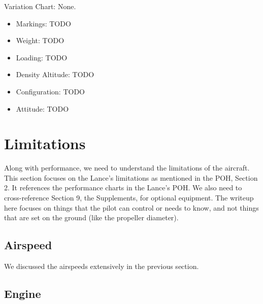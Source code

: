 Variation Chart: None.

\begin{itemize}
\item Markings: TODO
\item Weight: TODO
\item Loading: TODO
\item Density Altitude: TODO
\item Configuration: TODO
\item Attitude: TODO
\end{itemize}

%
%

\section{Limitations}

Along with performance, we need to understand the limitations of the aircraft. This section focuses on the Lance's limitations as mentioned in the POH, Section 2. It references the performance charts in the Lance's POH. We also need to cross-reference Section 9, the Supplements, for optional equipment. The writeup here focuses on things that the pilot can control or needs to know, and not things that are set on the ground (like the propeller diameter).

\subsection{Airspeed}

We discussed the airspeeds extensively in the previous section.

\subsection{Engine}

